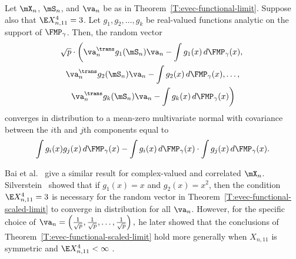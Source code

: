 \begin{theorem}\label{T:evec-functional-scaled-limit}
    Let $\mX_n$, $\mS_n$, and $\va_n$ be as in 
    Theorem~\ref{T:evec-functional-limit}. Suppose also that
    $\E X_{n,11}^4 = 3$.  Let $g_1, g_2, \ldots, g_k$
    be real-valued functions analytic on the support of $\FMP_\gamma$.  
    Then, the random vector
    \begin{multline*}
        \sqrt{p} \cdot
        \left(
            \va_n^\trans g_1( \mS_n ) \va_n
            -
            \int g_1(x) \, d\FMP_\gamma(x), \right. \\
            \va_n^\trans g_2( \mS_n ) \va_n
            -
            \int g_2(x) \, d\FMP_\gamma(x),
            \ldots, \\ \left.
            \va_n^\trans g_k( \mS_n ) \va_n
            -
            \int g_k(x) \, d\FMP_\gamma(x)
        \right)
    \end{multline*}
    converges in distribution to a mean-zero multivariate normal with
    covariance between the $i$th and $j$th components equal to
    \[
        \int
            g_i(x) g_j(x) \, d\FMP_\gamma(x)
        -
        \int
            g_i(x) \, d\FMP_\gamma(x)
        \cdot
        \int
            g_j(x) \, d\FMP_\gamma(x).
    \]
\end{theorem}

\noindent
Bai et al.~\cite{bai2007ael} give a similar result for complex-valued and correlated $\mX_n$.  Silverstein~\cite{silverstein1989eld} showed that if $g_1(x) = x$ and $g_2(x) = x^2$, then the condition $\E X_{n,11}^4 = 3$ is necessary for the random vector in Theorem~\ref{T:evec-functional-scaled-limit} to converge in distribution for all $\va_n$.  However, for the specific choice of
\(
    \va_n
    =
    \left(
        \frac{1}{\sqrt{p}},
        \frac{1}{\sqrt{p}},
        \ldots,        
        \frac{1}{\sqrt{p}}        
    \right),
\)
he later showed that the conclusions of Theorem~\ref{T:evec-functional-scaled-limit} hold more generally when $X_{n,11}$ is symmetric and $\E X_{n,11}^4 < \infty$ \cite{silverstein1990wcr}.  
